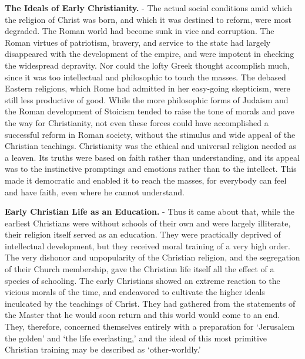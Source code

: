 \documentclass[]{book}
\begin{document}
\textbf{The Ideals of Early Christianity.} - The actual social conditions amid which the religion of Christ was born, and which it was destined to reform, were most degraded. The Roman world had become sunk in vice and corruption. The Roman virtues of patriotism, bravery, and service to the state had largely disappeared with the development of the empire, and were impotent in checking the widespread depravity. Nor could the lofty Greek thought accomplish much, since it was too intellectual and philosophic to touch the masses. The debased Eastern religions, which Rome had admitted in her easy-going skepticism, were still less productive of good. While the more philosophic forms of Judaism and the Roman development of Stoicism tended to raise the tone of morals and pave the way for Christianity, not even these forces could have accomplished a successful reform in Roman society, without the stimulus and wide appeal of the Christian teachings. Christianity was the ethical and universal religion needed as a leaven. Its truths were based on faith rather than understanding, and its appeal was to the instinctive promptings and emotions rather than to the intellect. This made it democratic and enabled it to reach the masses, for everybody can feel and have faith, even where he cannot understand.

\textbf{Early Christian Life as an Education.} - Thus it came about that, while the earliest Christians were without schools of their own and were largely illiterate, their religion itself served as an education. They were practically deprived of intellectual development, but they received moral training of a very high order. The very dishonor and unpopularity of the Christian religion, and the segregation of their Church membership, gave the Christian life itself all the effect of a species of schooling. The early Christians showed an extreme reaction to the vicious morals of the time, and endeavored to cultivate the higher ideals inculcated by the teachings of Christ. They had gathered from the statements of the Master that he would soon return and this world would come to an end. They, therefore, concerned themselves entirely with a preparation for `Jerusalem the golden' and `the life everlasting,' and the ideal of this most primitive Christian training may be described as `other-worldly.'
\end{document}
